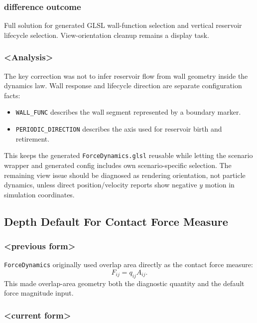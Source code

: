 \subsubsection{difference outcome}

Full solution for generated GLSL wall-function selection and vertical
reservoir lifecycle selection.  View-orientation cleanup remains a display
task.

\subsubsection{<Analysis>}

The key correction was not to infer reservoir flow from wall geometry inside
the dynamics law.  Wall response and lifecycle direction are separate
configuration facts:

\begin{itemize}
    \item \texttt{WALL\_FUNC} describes the wall segment represented by a
    boundary marker.
    \item \texttt{PERIODIC\_DIRECTION} describes the axis used for reservoir
    birth and retirement.
\end{itemize}

This keeps the generated \texttt{ForceDynamics.glsl} reusable while letting
the scenario wrapper and generated config includes own scenario-specific
selection.  The remaining view issue should be diagnosed as rendering
orientation, not particle dynamics, unless direct position/velocity reports
show negative \(y\) motion in simulation coordinates.

\subsection{Depth Default For Contact Force Measure}

\subsubsection{<previous form>}

\texttt{ForceDynamics} originally used overlap area directly as the contact
force measure:
\begin{equation}
F_{ij}=q_{ij}A_{ij}.
\end{equation}
This made overlap-area geometry both the diagnostic quantity and the default
force magnitude input.

\subsubsection{<current form>}

